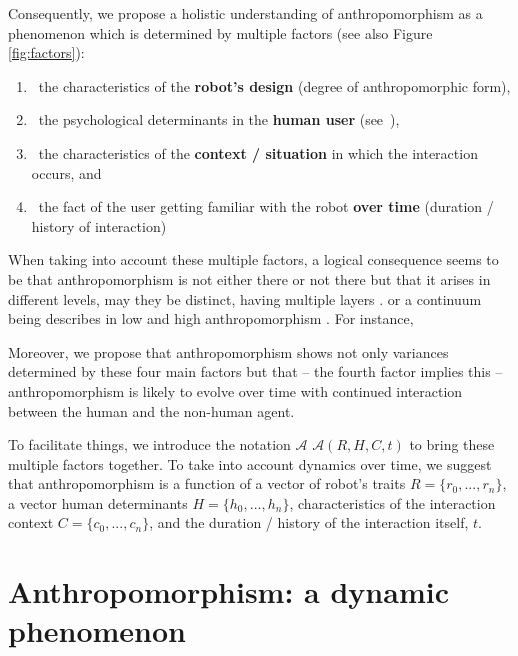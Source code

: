 \documentclass{frontiersSCNS} %
\newcommand{\Ant}[1][]{%
      \ifthenelse{\isempty{#1}}%
        {$\mathcal{A}$}
        {$\mathcal{A}(#1)$}
}
\begin{document}
Consequently, we propose a holistic understanding of anthropomorphism as a
phenomenon which is determined by multiple factors (see also Figure
\ref{fig:factors}):

\begin{enumerate}

\item ~the characteristics of the \textbf{robot's design} (degree of
    anthropomorphic form),

\item ~the psychological determinants in the \textbf{human user}
    (see~\cite{epley_seeing_2007}),

\item ~the characteristics of the \textbf{context / situation} in which the
    interaction occurs, and

\item ~the fact of the user getting familiar with the robot \textbf{over time}
    (duration / history of interaction)

\end{enumerate}


When taking into account these multiple factors, a logical consequence seems to
be that anthropomorphism is not either there or not there but that it arises in
different levels, may they be distinct, having multiple layers
\citep{persson_anthropomorphism_2000}. or a continuum being describes in low and
high anthropomorphism \citep{ruijten_introducing_2014}. For instance, 

Moreover, we propose that anthropomorphism shows not only variances determined
by these four main factors but that -- the fourth factor implies this --
anthropomorphism is likely to evolve over time with continued interaction
between the human and the non-human agent.

To facilitate things, we introduce the notation \Ant[R,H,C,t] to bring these
multiple factors together. To take into account dynamics over time, we suggest
that anthropomorphism is a function of a vector of robot's traits $R =
\{r_0,...,r_n\}$, a vector human determinants $H = \{h_0,...,h_n\}$,
characteristics of the interaction context $C = \{c_0,...,c_n\}$, and the
duration / history of the interaction itself, $t$.

%
%
%
%
%
%

\section{Anthropomorphism: a dynamic phenomenon}
\label{sec:our-ideas}
\end{document}
